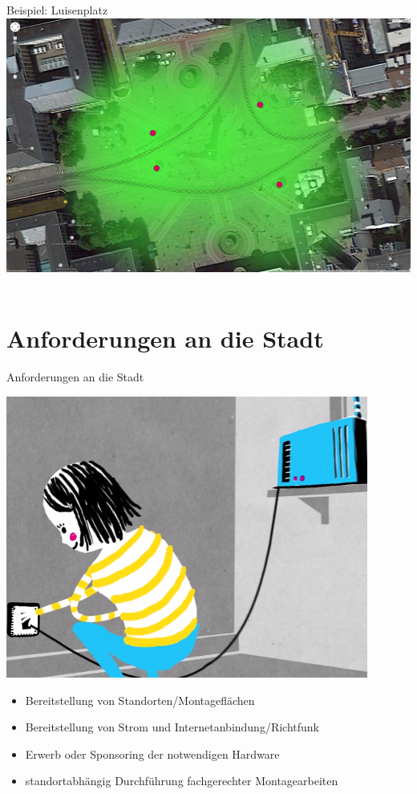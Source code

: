 \documentclass{beamer}
\begin{document}
\begin{frame}{Beispiel: Luisenplatz}
\includegraphics[height=0.75\textheight]{images/map_luisenplatz_3.jpg}$\;$
\end{frame}

\section{Anforderungen an die Stadt}
\begin{frame}{Anforderungen an die Stadt}
\vfill
\begin{center}
\includegraphics[height=0.4\textheight]{images/setup}$\;$
\vfill
\end{center}
\begin{itemize}
\item Bereitstellung von Standorten/Montageflächen
\item Bereitstellung von Strom und Internetanbindung/Richtfunk
\item Erwerb oder Sponsoring der notwendigen Hardware
\item standortabhängig Durchführung fachgerechter Montagearbeiten
\end{itemize}
\vfill
\end{frame}
\end{document}
